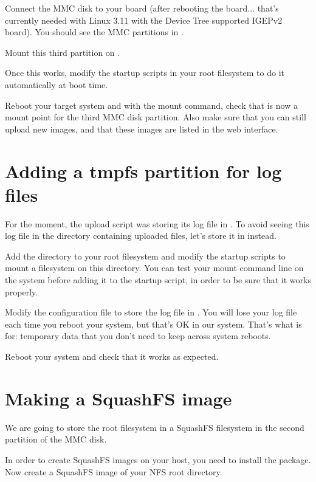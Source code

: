 Connect the MMC disk to your board (after rebooting the board... that's
currently needed with Linux 3.11 with the Device Tree supported IGEPv2
board). You should see the MMC partitions in .
  
Mount this third partition on .

Once this works, modify the startup scripts in your root filesystem
to do it automatically at boot time.

Reboot your target system and with the mount command, check that
 is now a mount point for the third MMC disk
partition. Also make sure that you can still upload new images, and
that these images are listed in the web interface.

\section{Adding a tmpfs partition for log files}

For the moment, the upload script was storing its log file in
. To avoid seeing this log file in
the directory containing uploaded files, let's store it in
 instead.

Add the  directory to your root filesystem and modify
the startup scripts to mount a  filesystem on this
directory. You can test your  mount command line on the
system before adding it to the startup script, in order to be sure
that it works properly.

Modify the  configuration file to store
the log file in . You will lose your log
file each time you reboot your system, but that's OK in our
system. That's what  is for: temporary data that you don't need
to keep across system reboots.

Reboot your system and check that it works as expected.

\section{Making a SquashFS image}

We are going to store the root filesystem in a SquashFS filesystem in
the second partition of the MMC disk.

In order to create SquashFS images on your host, you need to install
the  package. Now create a SquashFS image of your
NFS root directory.


